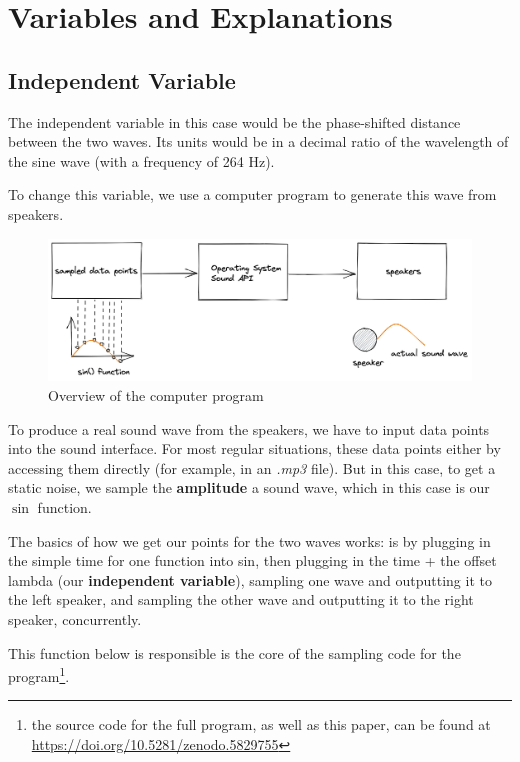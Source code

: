 \documentclass[index]{subfiles}
\begin{document}
\section{Variables and Explanations}

\subsection{Independent Variable}

The independent variable in this case would be the phase-shifted distance between the two waves. Its units would be in a decimal ratio of the wavelength of the sine wave (with a frequency of 264 Hz).

To change this variable, we use a computer program to generate this wave from speakers.

\begin{figure}[H]
    \centering
    \includegraphics[scale=0.2]{res/layout.png}
    \caption{Overview of the computer program}
\end{figure}

To produce a real sound wave from the speakers, we have to input data points into the sound interface. For most regular situations, these data points either by accessing them directly (for example, in an \textit{.mp3} file). But in this case, to get a static noise, we sample the \textbf{amplitude} a sound wave, which in this case is our \(\sin\) function.

The basics of how we get our points for the two waves works: is by plugging in the simple time for one function into sin, then plugging in the time + the offset lambda (our \textbf{independent variable}), sampling one wave and outputting it to the left speaker, and sampling the other wave and outputting it to the right speaker, concurrently.

This function below is responsible is the core of the sampling code for the program\footnote[1]{the source code for the full program, as well as this paper, can be found at \href{https://doi.org/10.5281/zenodo.5829755}{https://doi.org/10.5281/zenodo.5829755}}.
\end{document}
